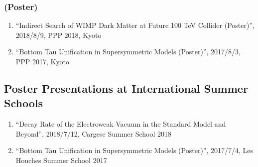 \documentclass[12pt]{article}
\begin{document}
\subsubsection*{(Poster)}
\begin{enumerate}
 \item ``Indirect Search of WIMP Dark Matter at Future 100 TeV Collider (Poster)'', 2018/8/9, PPP 2018, Kyoto
 \item ``Bottom Tau Unification in Supersymmetric Models (Poster)'', 2017/8/3, PPP 2017, Kyoto
\end{enumerate}

\subsection*{Poster Presentations at International Summer Schools}
\begin{enumerate}
 \item ``Decay Rate of the Electroweak Vacuum in the Standard Model and Beyond'', 2018/7/12, Cargese Summer School 2018
 \item ``Bottom Tau Unification in Supersymmetric Models (Poster)'', 2017/7/4, Les Houches Summer School 2017
\end{enumerate}
\end{document}
